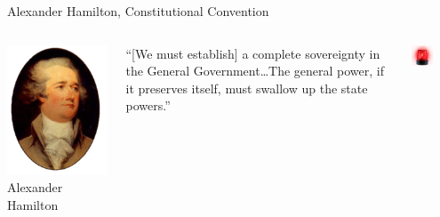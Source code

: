 \begin{frame}{Alexander Hamilton, Constitutional Convention}
    \begin{columns}[onlytextwidth]
            \centering
            \includegraphics[height=0.75\textheight]{img/hamilton.png} \\
            Alexander Hamilton \\

            \begin{block}{}
                ``[We must establish] a complete sovereignty in the General Government\ldots The general power, if it preserves itself, must swallow up the state powers.''
            \end{block}
            \pause
            {
                \centering
                \includegraphics[width=0.5\textwidth]{img/red-light.png} \\
            }
    \end{columns}
\end{frame}

